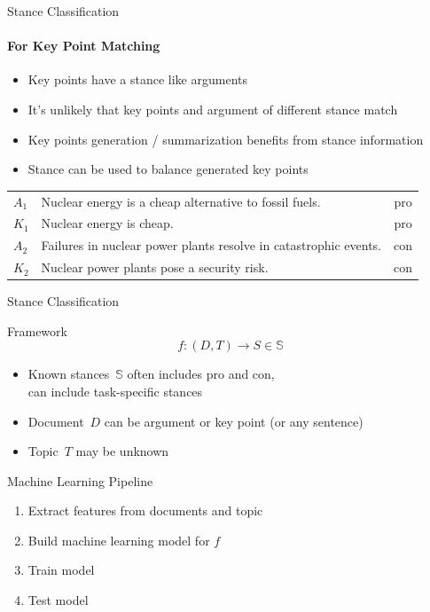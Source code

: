 \documentclass[english,handout]{mlutalk}
\begin{document}
\begin{frame}{Stance Classification}
  \framesubtitle{For Key Point Matching}
  
  \begin{itemize}
    \item Key points have a stance like arguments
    \item It's unlikely that key points and argument of different stance match
    \item Key points generation / summarization benefits from stance information~\cite{SanchanAB2017}
    \item Stance can be used to balance generated key points~\cite{ChowandaSSS2017}
  \end{itemize}

  \begin{example}
    \footnotesize\centering\vspace*{1ex}
    \begin{tabular}{llc}
      \toprule
      \(A_1\) & Nuclear energy is a cheap alternative to fossil fuels. & pro \\
      \(K_1\) & Nuclear energy is cheap. & pro \\
      \midrule
      \(A_2\) & Failures in nuclear power plants resolve in catastrophic events. & con \\
      \(K_2\) & Nuclear power plants pose a security risk. & con \\
      \bottomrule
    \end{tabular}
  \end{example}

\end{frame}

\begin{frame}{Stance Classification}

  \begin{block}{Framework}
    \begin{equation*}
      f: (D,T) \rightarrow S \in \mathbb{S}
    \end{equation*}  
    \begin{itemize}
      \item Known stances~\(\mathbb{S}\) often includes pro and con, \\ can include task-specific stances
      \item Document~\(D\) can be argument or key point (or any sentence)
      \item Topic~\(T\) may be unknown
    \end{itemize}
  \end{block}

  \begin{block}{Machine Learning Pipeline}
    \begin{enumerate}
        \item Extract features from documents and topic
        \item Build machine learning model for \(f\)
        \item Train model
        \item Test model
      \end{enumerate}
  \end{block}

\end{frame}
\end{document}
